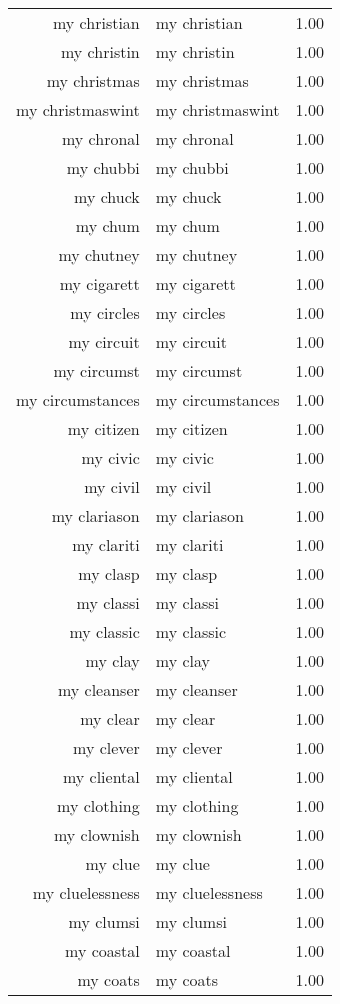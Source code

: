 \begin{table}[ht]
\begin{tabular}{rlr}
  my christian & my christian & 1.00 \\ 
  my christin & my christin & 1.00 \\ 
  my christmas & my christmas & 1.00 \\ 
  my christmaswint & my christmaswint & 1.00 \\ 
  my chronal & my chronal & 1.00 \\ 
  my chubbi & my chubbi & 1.00 \\ 
  my chuck & my chuck & 1.00 \\ 
  my chum & my chum & 1.00 \\ 
  my chutney & my chutney & 1.00 \\ 
  my cigarett & my cigarett & 1.00 \\ 
  my circles & my circles & 1.00 \\ 
  my circuit & my circuit & 1.00 \\ 
  my circumst & my circumst & 1.00 \\ 
  my circumstances & my circumstances & 1.00 \\ 
  my citizen & my citizen & 1.00 \\ 
  my civic & my civic & 1.00 \\ 
  my civil & my civil & 1.00 \\ 
  my clariason & my clariason & 1.00 \\ 
  my clariti & my clariti & 1.00 \\ 
  my clasp & my clasp & 1.00 \\ 
  my classi & my classi & 1.00 \\ 
  my classic & my classic & 1.00 \\ 
  my clay & my clay & 1.00 \\ 
  my cleanser & my cleanser & 1.00 \\ 
  my clear & my clear & 1.00 \\ 
  my clever & my clever & 1.00 \\ 
  my cliental & my cliental & 1.00 \\ 
  my clothing & my clothing & 1.00 \\ 
  my clownish & my clownish & 1.00 \\ 
  my clue & my clue & 1.00 \\ 
  my cluelessness & my cluelessness & 1.00 \\ 
  my clumsi & my clumsi & 1.00 \\ 
  my coastal & my coastal & 1.00 \\ 
  my coats & my coats & 1.00 \\ 

\end{tabular}
\end{table}
